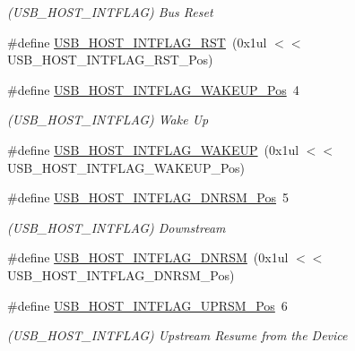 \begin{DoxyCompactItemize}
\begin{DoxyCompactList}\small\item\em (U\+S\+B\+\_\+\+H\+O\+S\+T\+\_\+\+I\+N\+T\+F\+L\+AG) Bus Reset \end{DoxyCompactList}\item 
\#define \mbox{\hyperlink{group___s_a_m_d21___u_s_b_ga755fb028bde9e3cdf6e642b4d47f18de}{U\+S\+B\+\_\+\+H\+O\+S\+T\+\_\+\+I\+N\+T\+F\+L\+A\+G\+\_\+\+R\+ST}}~(0x1ul $<$$<$ U\+S\+B\+\_\+\+H\+O\+S\+T\+\_\+\+I\+N\+T\+F\+L\+A\+G\+\_\+\+R\+S\+T\+\_\+\+Pos)
\item 
\#define \mbox{\hyperlink{group___s_a_m_d21___u_s_b_ga6ebc1f3494f6fad4e601d84a0d956a44}{U\+S\+B\+\_\+\+H\+O\+S\+T\+\_\+\+I\+N\+T\+F\+L\+A\+G\+\_\+\+W\+A\+K\+E\+U\+P\+\_\+\+Pos}}~4
\begin{DoxyCompactList}\small\item\em (U\+S\+B\+\_\+\+H\+O\+S\+T\+\_\+\+I\+N\+T\+F\+L\+AG) Wake Up \end{DoxyCompactList}\item 
\#define \mbox{\hyperlink{group___s_a_m_d21___u_s_b_ga5d2df38ffcf0b2fdca79d0d68d7c4569}{U\+S\+B\+\_\+\+H\+O\+S\+T\+\_\+\+I\+N\+T\+F\+L\+A\+G\+\_\+\+W\+A\+K\+E\+UP}}~(0x1ul $<$$<$ U\+S\+B\+\_\+\+H\+O\+S\+T\+\_\+\+I\+N\+T\+F\+L\+A\+G\+\_\+\+W\+A\+K\+E\+U\+P\+\_\+\+Pos)
\item 
\#define \mbox{\hyperlink{group___s_a_m_d21___u_s_b_ga038c091d0853930f01ccdb9556c2c52b}{U\+S\+B\+\_\+\+H\+O\+S\+T\+\_\+\+I\+N\+T\+F\+L\+A\+G\+\_\+\+D\+N\+R\+S\+M\+\_\+\+Pos}}~5
\begin{DoxyCompactList}\small\item\em (U\+S\+B\+\_\+\+H\+O\+S\+T\+\_\+\+I\+N\+T\+F\+L\+AG) Downstream \end{DoxyCompactList}\item 
\#define \mbox{\hyperlink{group___s_a_m_d21___u_s_b_ga94c81c68c0259d2e400354c9e2427a3c}{U\+S\+B\+\_\+\+H\+O\+S\+T\+\_\+\+I\+N\+T\+F\+L\+A\+G\+\_\+\+D\+N\+R\+SM}}~(0x1ul $<$$<$ U\+S\+B\+\_\+\+H\+O\+S\+T\+\_\+\+I\+N\+T\+F\+L\+A\+G\+\_\+\+D\+N\+R\+S\+M\+\_\+\+Pos)
\item 
\#define \mbox{\hyperlink{group___s_a_m_d21___u_s_b_ga03d2c6191e0f7c5c597c619d3162221f}{U\+S\+B\+\_\+\+H\+O\+S\+T\+\_\+\+I\+N\+T\+F\+L\+A\+G\+\_\+\+U\+P\+R\+S\+M\+\_\+\+Pos}}~6
\begin{DoxyCompactList}\small\item\em (U\+S\+B\+\_\+\+H\+O\+S\+T\+\_\+\+I\+N\+T\+F\+L\+AG) Upstream Resume from the Device \end{DoxyCompactList}\item 
$$
\end{DoxyCompactItemize}
